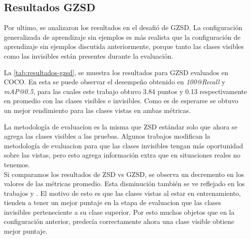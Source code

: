 \subsection{Resultados GZSD}
Por ultimo, se analizaron los resultados en el desafió de GZSD. La configuración generalizada de aprendizaje sin ejemplos es más realista que la configuración de aprendizaje sin ejemplos discutida anteriormente, porque tanto las clases visibles como las invisibles están presentes durante la evaluación.

La \autoref{tab:resultados-gzsd}, se muestra los resultados para GZSD evaluados en COCO. En esta se puede observar el desempeño obtenido en \textit{100@Recall} y \textit{mAP@0.5}, para las cuales este trabajo obtuvo 3.84 puntos y 0.13 respectivamente en promedio con las clases visibles e invisibles. Como es de esperarse se obtuvo un mejor rendimiento para las clases vistas en ambas métricas.

La metodología de evaluacion es la misma que ZSD estándar solo que ahora se agrega las clases visibles a las pruebas. Algunos trabajos modifican la metodología de evaluacion para que las clases invisibles tengan más oportunidad sobre las vistas, pero esto agrega información extra que en situaciones reales no tenemos.\\

Si comparamos los resultados de ZSD vs GZSD, se observa un decremento en los valores de las métricas promedio. Esta disminución también se ve reflejado en los trabajos \cite{bansal2018zero} y \cite{rahman2020zero}. El motivo de esto es que las clases vistas al estar en entrenamiento, tienden a tener un mejor puntaje en la etapa de evaluacion que las clases invisibles perteneciente a su clase superior. Por esto muchos objetos que en la configuración anterior, predecía correctamente ahora una clase visible obtiene mejor puntaje.\\


